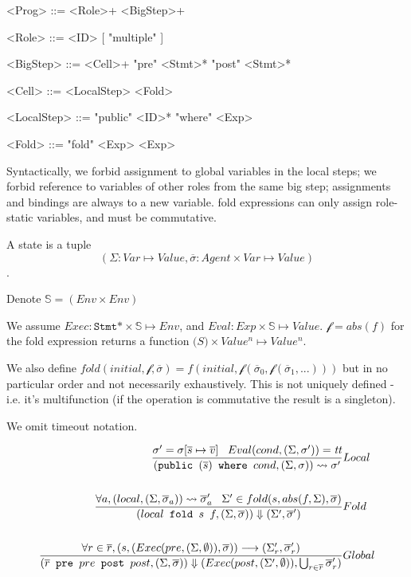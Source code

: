 \documentclass[acmsmall,review,anonymous]{acmart}\settopmatter{printfolios=true}
\begin{document}
\begin{grammar}
	<Prog>      ::= <Role>+ <BigStep>+

	<Role>		::= <ID> [ "multiple" ]

	<BigStep>   ::= <Cell>+ "pre" <Stmt>* "post" <Stmt>*

	<Cell> 		::= <LocalStep> <Fold>

	<LocalStep> ::= "public" <ID>* "where" <Exp>
	
	<Fold>      ::= "fold" <Exp> <Exp>
\end{grammar}

Syntactically, we forbid assignment to global variables in the local steps;
we forbid reference to variables of other roles from the same big step;
assignments and bindings are always to a new variable.
fold expressions can only assign role-static variables, and must be commutative.

A state is a tuple 
\[
	(\Sigma: Var \mapsto Value, \overline{\sigma}: Agent \times Var \mapsto Value )
\].

Denote $\mathbb{S} = (Env \times Env)$


\newcommand{\G}{\Sigma}
\newcommand{\s}{\sigma}
\newcommand{\R}{\overline{\s}}

We assume $Exec: \texttt{Stmt*} \times \mathbb{S} \mapsto Env $, and $Eval: Exp \times \mathbb{S} \mapsto Value$.
$\mathcal{f} = abs(f)$ for the fold expression returns a function $\mathbb(S) \times Value^n \mapsto Value^n$.

We also define $fold(initial, \mathcal{f}, \R)= f(initial, \mathcal{f}(\R_0, \mathcal{f}(\R_1, ...)))$ but in no particular order and not necessarily exhaustively.
This is not uniquely defined - i.e. it's multifunction (if the operation is commutative the result is a singleton).

We omit timeout notation.

\begin{align*}
	\judge{&Local}{
		\s' = \s[\overline{s} \mapsto \overline{v}] \;\;\;
		Eval(cond, (\G, \s')) = \emph{tt}
	}{
		(\texttt{public }(\overline{s}) \texttt{ where } cond, (\G, \s)) \rightsquigarrow \s'
	}\\
	\\
	\judge{&Fold}{
		\forall a, (local, (\G, \R_a)) \rightsquigarrow \R'_a \;\;\;
		\G' \in fold(s, abs(f, \G), \R)
	}{
		(local \texttt{ fold } s \texttt{ } f, (\G, \R)) \Downarrow (\G', \R')
	}\\
	\\
	\judge{&Global}{
		\forall r \in \overline{r}, (s, (Exec(pre, (\G, \emptyset)), \R)) \longrightarrow (\G'_r, \R'_r)
	}{
		(\overline{r} \texttt{ pre } pre \texttt{ post } post, (\G, \R))
		\Downarrow (Exec(post, (\G', \emptyset)), \bigcup_{r\in \overline{r}} \R'_r)
	}
\end{align*}
\end{document}
